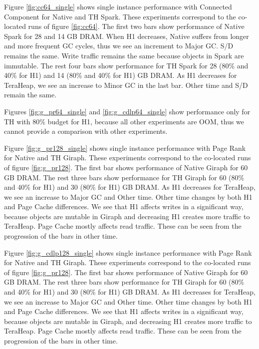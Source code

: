 Figure \ref{fig:cc64_single} shows single instance performance with Connected Component for Native and TH Spark. These experiments correspond to the co-located runs of figure \ref{fig:cc64}. The first two bars show performance of Native Spark for 28 and 14 GB DRAM. When H1 decreases, Native suffers from longer and more frequent GC cycles, thus we see an increment to Major GC. S/D remains the same. Write traffic remains the same because objects in Spark are immutable. The rest four bars show performance for TH Spark for 28 (80\% and 40\% for H1) and 14 (80\% and 40\% for H1) GB DRAM. As H1 decreases for TeraHeap, we see an increase to Minor GC in the last bar. Other time and S/D remain the same.

Figures \ref{fig:g_pr64_single} and \ref{fig:g_cdlp64_single} show performance only for TH with 80\% budget for H1, because all other experiments are OOM, thus  we cannot provide a comparison with other experiments.

Figure \ref{fig:g_pr128_single} shows single instance performance with Page Rank for Native and TH Giraph. These experiments correspond to the co-located runs of figure \ref{fig:g_pr128}. The first bar shows performance of Native Giraph for 60 GB DRAM. The rest three bars show performance for TH Giraph for 60 (80\% and 40\% for H1) and 30 (80\% for H1) GB DRAM. As H1 decreases for TeraHeap, we see an increase to Major GC  and Other time. Other time changes by both H1 and Page Cache differences. We see that H1 affects writes in a significant way, because objects are mutable in Giraph and decreasing H1 creates more traffic to TeraHeap. Page Cache mostly affects read traffic. These can be seen from the progression of the bars in other time.

Figure \ref{fig:g_cdlp128_single} shows single instance performance with Page Rank for Native and TH Giraph. These experiments correspond to the co-located runs of figure \ref{fig:g_pr128}. The first bar shows performance of Native Giraph for 60 GB DRAM. The rest three bars show performance for TH Giraph for 60 (80\% and 40\% for H1) and 30 (80\% for H1) GB DRAM. As H1 decreases for TeraHeap, we see an increase to Major GC  and Other time. Other time changes by both H1 and Page Cache differences. We see that H1 affects writes in a significant way, because objects are mutable in Giraph, and decreasing H1 creates more traffic to TeraHeap. Page Cache mostly affects read traffic. These can be seen from the progression of the bars in other time.

